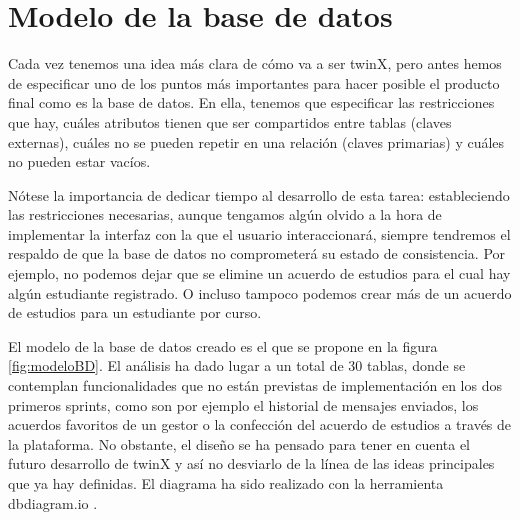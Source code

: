 \section{Modelo de la base de datos}
\label{sec:modelobd}

Cada vez tenemos una idea más clara de cómo va a ser twinX, pero antes hemos de especificar uno de los puntos más importantes para hacer posible el producto final como es la base de datos. En ella, tenemos que especificar las restricciones que hay, cuáles atributos tienen que ser compartidos entre tablas (claves externas), cuáles no se pueden repetir en una relación (claves primarias) y cuáles no pueden estar vacíos.

Nótese la importancia de dedicar tiempo al desarrollo de esta tarea: estableciendo las restricciones necesarias, aunque tengamos algún olvido a la hora de implementar la interfaz con la que el usuario interaccionará, siempre tendremos el respaldo de que la base de datos no comprometerá su estado de consistencia. Por ejemplo, no podemos dejar que se elimine un acuerdo de estudios para el cual hay algún estudiante registrado. O incluso tampoco podemos crear más de un acuerdo de estudios para un estudiante por curso.

El modelo de la base de datos creado es el que se propone en la figura \ref{fig:modeloBD}. El análisis ha dado lugar a un total de 30 tablas, donde se contemplan funcionalidades que no están previstas de implementación en los dos primeros sprints, como son por ejemplo el historial de mensajes enviados, los acuerdos favoritos de un gestor o la confección del acuerdo de estudios a través de la plataforma. No obstante, el diseño se ha pensado para tener en cuenta el futuro desarrollo de twinX y así no desviarlo de la línea de las ideas principales que ya hay definidas. El diagrama ha sido realizado con la herramienta dbdiagram.io \cite{dbdiagram}.

